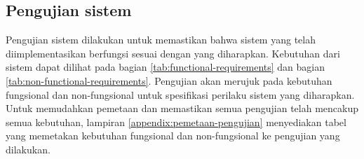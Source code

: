 \subsection{Pengujian sistem}
\label{subsection:pengujian-sistem}

Pengujian sistem dilakukan untuk memastikan bahwa sistem yang telah diimplementasikan berfungsi sesuai dengan yang diharapkan. Kebutuhan dari sistem dapat dilihat pada bagian \ref{tab:functional-requirements} dan bagian \ref{tab:non-functional-requirements}. Pengujian akan merujuk pada kebutuhan fungsional dan non-fungsional untuk spesifikasi perilaku sistem yang diharapkan. Untuk memudahkan pemetaan dan memastikan semua pengujian telah mencakup semua kebutuhan, lampiran \ref{appendix:pemetaan-pengujian} menyediakan tabel yang memetakan kebutuhan fungsional dan non-fungsional ke pengujian yang dilakukan.















